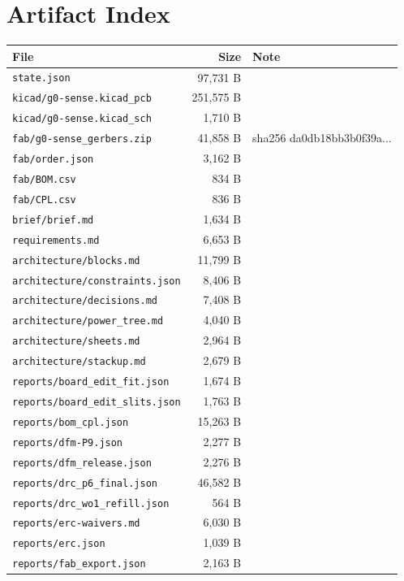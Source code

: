 \documentclass[11pt,a4paper]{article}
\begin{document}
\section{Artifact Index}
{\small
\begin{longtable}{p{9cm}rp{4cm}}
\toprule
\textbf{File} & \textbf{Size} & \textbf{Note} \\
\midrule
\endhead
\texttt{state.json} & 97,731 B &  \\
\texttt{kicad/g0-sense.kicad\_pcb} & 251,575 B &  \\
\texttt{kicad/g0-sense.kicad\_sch} & 1,710 B &  \\
\texttt{fab/g0-sense\_gerbers.zip} & 41,858 B & sha256 da0db18bb3b0f39a... \\
\texttt{fab/order.json} & 3,162 B &  \\
\texttt{fab/BOM.csv} & 834 B &  \\
\texttt{fab/CPL.csv} & 836 B &  \\
\texttt{brief/brief.md} & 1,634 B &  \\
\texttt{requirements.md} & 6,653 B &  \\
\texttt{architecture/blocks.md} & 11,799 B &  \\
\texttt{architecture/constraints.json} & 8,406 B &  \\
\texttt{architecture/decisions.md} & 7,408 B &  \\
\texttt{architecture/power\_tree.md} & 4,040 B &  \\
\texttt{architecture/sheets.md} & 2,964 B &  \\
\texttt{architecture/stackup.md} & 2,679 B &  \\
\texttt{reports/board\_edit\_fit.json} & 1,674 B &  \\
\texttt{reports/board\_edit\_slits.json} & 1,763 B &  \\
\texttt{reports/bom\_cpl.json} & 15,263 B &  \\
\texttt{reports/dfm-P9.json} & 2,277 B &  \\
\texttt{reports/dfm\_release.json} & 2,276 B &  \\
\texttt{reports/drc\_p6\_final.json} & 46,582 B &  \\
\texttt{reports/drc\_wo1\_refill.json} & 564 B &  \\
\texttt{reports/erc-waivers.md} & 6,030 B &  \\
\texttt{reports/erc.json} & 1,039 B &  \\
\texttt{reports/fab\_export.json} & 2,163 B &  \\

\end{longtable}}
\end{document}
